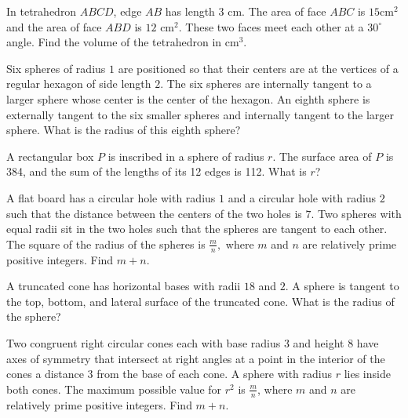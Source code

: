 \documentclass{article}
\begin{document}
\begin{prob}[AIME 1984/9]{2}
In tetrahedron $ABCD$, edge $AB$ has length 3 cm. The area of face $ABC$ is $15\mbox{cm}^2$ and the area of face $ABD$ is $12 \mbox { cm}^2$. These two faces meet each other at a $30^\circ$ angle. Find the volume of the tetrahedron in $\mbox{cm}^3$.
\end{prob}

\begin{prob}[AMC 10A 2013/22]{3}
Six spheres of radius $1$ are positioned so that their centers are at the vertices of a regular hexagon of side length $2$. The six spheres are internally tangent to a larger sphere whose center is the center of the hexagon. An eighth sphere is externally tangent to the six smaller spheres and internally tangent to the larger sphere. What is the radius of this eighth sphere?
\end{prob}

\begin{prob}[AMC 12A 2005/22]{3}
A rectangular box $P$ is inscribed in a sphere of radius $r$. The surface area of $P$ is 384, and the sum of the lengths of its 12 edges is 112. What is $r$?
\end{prob}

\begin{prob}[AIME I 2020/6]{3}
A flat board has a circular hole with radius $1$ and a circular hole with radius $2$ such that the distance between the centers of the two holes is $7.$ Two spheres with equal radii sit in the two holes such that the spheres are tangent to each other. The square of the radius of the spheres is $\tfrac{m}{n},$ where $m$ and $n$ are relatively prime positive integers. Find $m+n.$
\end{prob}

\begin{prob}[AMC 12B 2004/19]{3}
A truncated cone has horizontal bases with radii $18$ and $2$. A sphere is tangent to the top, bottom, and lateral surface of the truncated cone. What is the radius of the sphere?
\end{prob}

\begin{prob}[AIME II 2020/7]{4}
Two congruent right circular cones each with base radius $3$ and height $8$ have axes of symmetry that intersect at right angles at a point in the interior of the cones a distance $3$ from the base of each cone. A sphere with radius $r$ lies inside both cones. The maximum possible value for $r^2$ is $\frac mn$, where $m$ and $n$ are relatively prime positive integers. Find $m+n$.
\end{prob}
\end{document}
